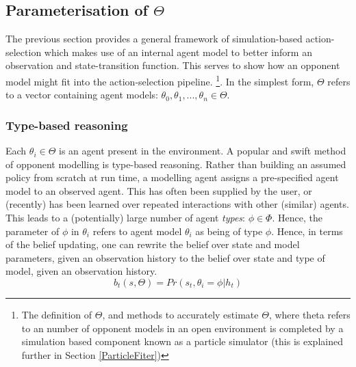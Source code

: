 \subsection{Parameterisation of $\Theta$} \label{IncludingAgentModels}
The previous section provides a general framework of simulation-based action-selection which makes use of an internal agent model to better inform an observation and state-transition function. This serves to show how an opponent model might fit into the action-selection pipeline.
\footnote{The definition of $\Theta$, and methods to accurately estimate $\Theta$, where theta refers to an number of opponent models in an open environment is completed by a simulation based component known as a particle simulator (this is explained further in Section \ref{ParticleFiter})}.
\newline\newline
In the simplest form, $\Theta$ refers to a vector containing agent models: ${\theta_0, \theta_1,...,\theta_n} \in \Theta$. 
\subsubsection{Type-based reasoning}
Each $\theta_i \in \Theta$ is an agent present in the environment.    
A popular and swift method of opponent modelling is type-based reasoning. Rather than building an assumed policy from scratch at run time, a modelling agent assigns a pre-specified agent model to an observed agent. This has often been supplied by the user, or (recently) has been learned over repeated interactions with other (similar) agents. 
This leads to a (potentially) large number of agent \textit{types}: $\phi \in \Phi$.
\newline \newline
Hence, the parameter of $\phi$ in $\theta_i$ refers to agent model $\theta_i$ as being of type $\phi$. 
\newline \newline
Hence, in terms of the belief updating, one can rewrite the belief over state and model parameters, given an observation history to the belief over state and type of model, given an observation history. 
\begin{equation}
    b_t(s,\Theta) = Pr(s_t,\theta_i = \phi | h_t)
\end{equation}




